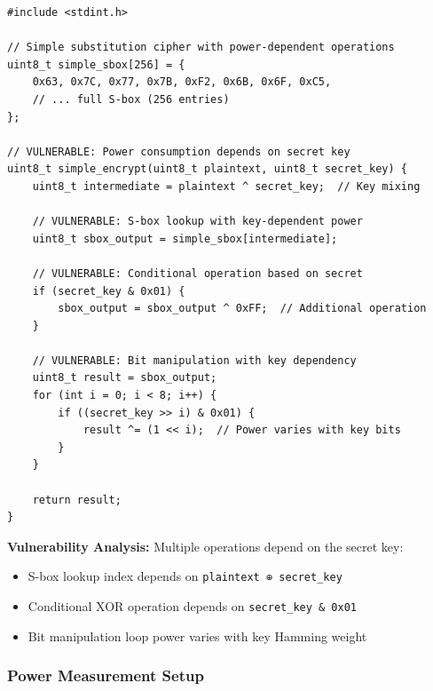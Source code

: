 \documentclass[11pt,a4paper]{article}
\theoremstyle{definition}
\begin{document}
\begin{lstlisting}[caption={Simple Vulnerable Crypto Implementation}]
#include <stdint.h>

// Simple substitution cipher with power-dependent operations
uint8_t simple_sbox[256] = {
    0x63, 0x7C, 0x77, 0x7B, 0xF2, 0x6B, 0x6F, 0xC5,
    // ... full S-box (256 entries)
};

// VULNERABLE: Power consumption depends on secret key
uint8_t simple_encrypt(uint8_t plaintext, uint8_t secret_key) {
    uint8_t intermediate = plaintext ^ secret_key;  // Key mixing
    
    // VULNERABLE: S-box lookup with key-dependent power
    uint8_t sbox_output = simple_sbox[intermediate];
    
    // VULNERABLE: Conditional operation based on secret
    if (secret_key & 0x01) {
        sbox_output = sbox_output ^ 0xFF;  // Additional operation
    }
    
    // VULNERABLE: Bit manipulation with key dependency  
    uint8_t result = sbox_output;
    for (int i = 0; i < 8; i++) {
        if ((secret_key >> i) & 0x01) {
            result ^= (1 << i);  // Power varies with key bits
        }
    }
    
    return result;
}
\end{lstlisting}

\textbf{Vulnerability Analysis:} Multiple operations depend on the secret key:
\begin{itemize}
    \item S-box lookup index depends on \texttt{plaintext ⊕ secret\_key}
    \item Conditional XOR operation depends on \texttt{secret\_key \& 0x01}
    \item Bit manipulation loop power varies with key Hamming weight
\end{itemize}

\subsubsection{Power Measurement Setup}
\end{document}
